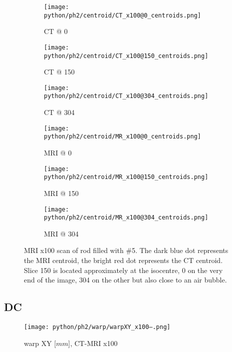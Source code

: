 \begin{figure}[!tbp]
  \begin{subfigure}[b]{0.32\textwidth}
    \texttt{[image: python/ph2/centroid/CT\_x100@0\_centroids.png]}
    \caption{CT @ 0}
    \label{fig:CT_x100_centroids@0}
  \end{subfigure}
  \begin{subfigure}[b]{0.32\textwidth}
    \texttt{[image: python/ph2/centroid/CT\_x100@150\_centroids.png]}
    \caption{CT @ 150}
    \label{fig:CT_x100_centroids@150}
  \end{subfigure}
  \begin{subfigure}[b]{0.32\textwidth}
    \texttt{[image: python/ph2/centroid/CT\_x100@304\_centroids.png]}
    \caption{CT @ 304}
    \label{fig:CT_x100_centroids@304}
  \end{subfigure}
  \begin{subfigure}[b]{0.32\textwidth}
    \texttt{[image: python/ph2/centroid/MR\_x100@0\_centroids.png]}
    \caption{MRI @ 0}
    \label{fig:MR_x100_centroids@0}
  \end{subfigure}
  \begin{subfigure}[b]{0.32\textwidth}
    \texttt{[image: python/ph2/centroid/MR\_x100@150\_centroids.png]}
    \caption{MRI @ 150}
    \label{fig:MR_x100_centroids@150}
  \end{subfigure}
  \begin{subfigure}[b]{0.32\textwidth}
    \texttt{[image: python/ph2/centroid/MR\_x100@304\_centroids.png]}
    \caption{MRI @ 304}
    \label{fig:MR_x100_centroids@304}
  \end{subfigure}
  \caption{MRI x100 scan of rod filled with \#5. The dark blue dot represents the MRI centroid, the bright red dot represents the CT centroid.
  			\\ Slice 150 is located approximately at the isocentre, 0 on the very end of the image, 304 on the other but also close to an air bubble.}
  \label{fig:MR_x100_centroids}
\end{figure}

\clearpage

\subsection{DC}

\begin{figure}[!bp]
  \centering
  \texttt{[image: python/ph2/warp/warpXY\_x100--.png]}
  \caption{warp XY [$mm$], CT-MRI x100}
  \label{fig:warpXY_x100}
\end{figure}

